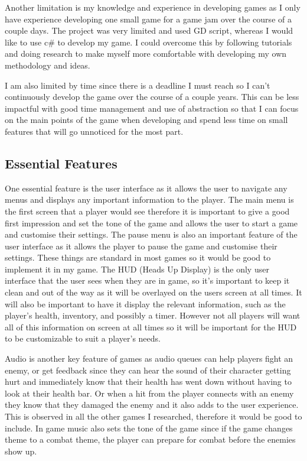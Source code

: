 \documentclass{article}
\newcommand{\parBr}{\vspace{5mm}}%
\begin{document}
\parBr

Another limitation is my knowledge and experience in developing games as I only have experience developing one small game for a game jam over the course of a couple days. The project was very limited and used GD script, whereas I would like to use c\# to develop my game. I could overcome  this by following tutorials and doing research to make myself more comfortable with developing my own methodology and ideas.

\parBr

I am also limited by time since there is a deadline I must reach so  I can't continuously develop the game over the course of a couple years. This can be less impactful with good time management and use of abstraction so that I can focus on the main points of the game when developing and spend less time on small features that will go unnoticed for the most part.

\subsection{Essential Features}
One essential feature is the user interface as it allows the user to navigate any menus and displays any important information to the player. The main menu is the first screen that a player would see therefore it is important to give a good  first impression and set the tone of the game and allows the user to start a game and customise their settings. The pause menu is also an important feature of the user interface as it allows the player to pause the game and customise their settings. These things are standard in most games so it would be good to implement it in my game. The HUD (Heads Up Display) is the only user interface that the user sees when they are in game, so it's important to keep it clean and out of the way as it will be overlayed on the users screen at all times. It will also be important to have it display the relevant information, such as the player's health, inventory, and possibly a timer. However not all players will want all of this information on screen at all times so it will be important for the HUD to be customizable to suit a player's needs.

\parBr

Audio is another key feature of games as audio queues can help players fight an enemy, or get feedback since they can hear the sound of their character getting hurt and immediately know that their health has went down without having to look at their health bar. Or when a hit from the player connects with an enemy they know that they damaged the enemy and it also adds to the user experience. This is observed in all the other games I researched, therefore it would be good to include. In game music also sets the tone of the game since if the game changes theme to a combat theme, the player can prepare for combat before the enemies show up.
\end{document}
